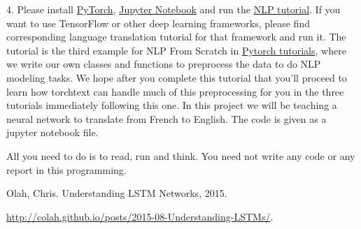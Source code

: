 \documentclass{article}
\begin{document}
4. Please install \href{https://pytorch.org/}{PyTorch}, \href{https://jupyter.org/install}{Jupyter Notebook} and run the \href{https://pytorch.org/tutorials/_downloads/a60617788061539b5449701ae76aee56/seq2seq_translation_tutorial.ipynb}{NLP tutorial}. If you want to use TensorFlow or other deep learning frameworks, please find corresponding language translation tutorial for that framework and run it. The tutorial is the third example for NLP From Scratch in \href{https://pytorch.org/tutorials/index.html}{Pytorch tutorials}, where we write our own classes and functions to preprocess the data to do NLP modeling tasks. We hope after you complete this tutorial that you'll proceed to learn how torchtext can handle much of this preprocessing for you in the three tutorials immediately following this one. In this project we will be teaching a neural network to translate from French to English. The code is given as a jupyter notebook file. 

All you need to do is to read, run and think. You need not write any code or any report in this programming.

\begin{thebibliography}{1}

Olah, Chris. Understanding LSTM Networks, 2015. 

\url{http://colah.github.io/posts/2015-08-Understanding-LSTMs/}.


\end{thebibliography}
\end{document}
